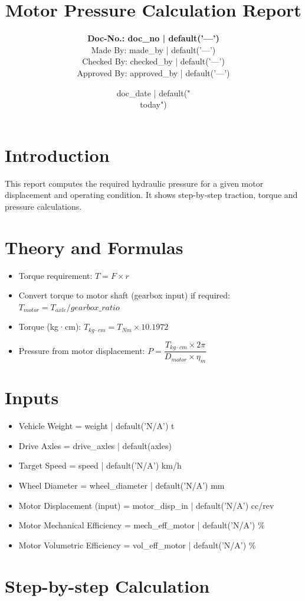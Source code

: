 \documentclass[14pt]{article}
\title{\textbf{Motor Pressure Calculation Report}}
\author{\textbf{Doc-No.: {{ doc_no | default('—') }}}\\
Made By: {{ made_by | default('—') }}\\
Checked By: {{ checked_by | default('—') }}\\
Approved By: {{ approved_by | default('—') }}}
\date{{ doc_date | default("\\today") }}
\begin{document}
\maketitle

\section*{Introduction}
This report computes the required hydraulic pressure for a given motor displacement and operating condition. It shows step-by-step traction, torque and pressure calculations.

\section{Theory and Formulas}
\begin{itemize}
  \item Torque requirement: $T = F \times r$
  \item Convert torque to motor shaft (gearbox input) if required: $T_{motor} = T_{axle} / gearbox\_ratio$
  \item Torque (kg·cm): $T_{kg\cdot cm} = T_{Nm} \times 10.1972$
  \item Pressure from motor displacement: $P = \dfrac{T_{kg\cdot cm} \times 2\pi}{D_{motor} \times \eta_m}$
\end{itemize}

\section{Inputs}
\begin{itemize}
  \item Vehicle Weight = {{ weight | default('N/A') }} t
  \item Drive Axles = {{ drive_axles | default(axles) }}
  \item Target Speed = {{ speed | default('N/A') }} km/h
  \item Wheel Diameter = {{ wheel_diameter | default('N/A') }} mm
  \item Motor Displacement (input) = {{ motor_disp_in | default('N/A') }} cc/rev
  \item Motor Mechanical Efficiency = {{ mech_eff_motor | default('N/A') }} \%
  \item Motor Volumetric Efficiency = {{ vol_eff_motor | default('N/A') }} \%
\end{itemize}

\section{Step-by-step Calculation}
\end{document}
